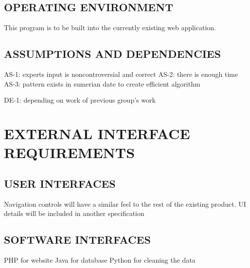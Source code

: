\documentclass[11pt]{article}
\begin{document}
\subsection{OPERATING ENVIRONMENT}
This program is to be built into the currently existing web application.

\subsection{ASSUMPTIONS AND DEPENDENCIES}
AS-1: experts input is noncontroversial and correct
AS-2: there is enough time
AS-3: pattern exists in sumerian date to create efficient algorithm

DE-1: depending on work of previous group’s work


\section{EXTERNAL INTERFACE REQUIREMENTS}
\subsection{USER INTERFACES}
Navigation controls will have a similar feel to the rest of the existing product.
UI details will be included in another specification

\subsection{SOFTWARE INTERFACES}
PHP for website
Java for database
Python for cleaning the data
\end{document}
